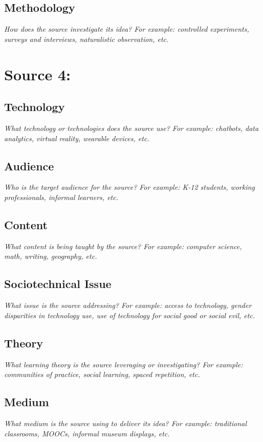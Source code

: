\documentclass[12pt, final]{article}
\begin{document}
\subsection{Methodology}
\textit{How does the source investigate its idea? For example: controlled experiments, surveys and interviews, naturalistic observation, etc.}

\section{Source 4: } \label{Source 4}

\subsection{Technology}
\textit{What technology or technologies does the source use? For example: chatbots, data analytics, virtual reality, wearable devices, etc.}

\subsection{Audience}
\textit{Who is the target audience for the source? For example: K-12 students, working professionals, informal learners, etc.}

\subsection{Content}
\textit{What content is being taught by the source? For example: computer science, math, writing, geography, etc.}

\subsection{Sociotechnical Issue}
\textit{What issue is the source addressing? For example: access to technology, gender disparities in technology use, use of technology for social good or social evil, etc.}

\subsection{Theory}
\textit{What learning theory is the source leveraging or investigating? For example: communities of practice, social learning, spaced repetition, etc.}

\subsection{Medium}
\textit{What medium is the source using to deliver its idea? For example: traditional classrooms, MOOCs, informal museum displays, etc.}
\end{document}
